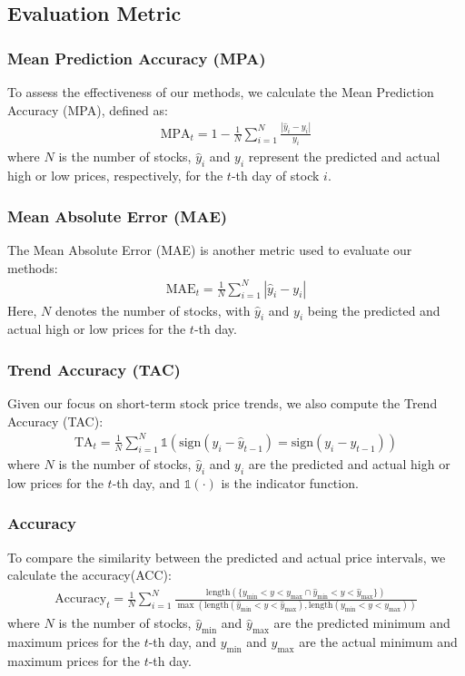 \subsection{Evaluation Metric}

\subsubsection{Mean Prediction Accuracy (MPA)}
To assess the effectiveness of our methods, we calculate the Mean Prediction Accuracy (MPA), defined as:
\begin{align}
    \label{eq:MPA}
    \text{MPA}_{t} = 1 - \frac{1}{N} \sum_{i=1}^{N} \frac{|\hat{y}_i - y_i|}{y_i}
\end{align}
where $ N $ is the number of stocks, $ \hat{y}_i $ and $ y_i $ represent the predicted and actual high or low prices, respectively, for the $ t $-th day of stock $ i $.

\subsubsection{Mean Absolute Error (MAE)}
The Mean Absolute Error (MAE) is another metric used to evaluate our methods:
\begin{align}
    \label{eq:MAE}
    \text{MAE}_{t} = \frac{1}{N} \sum_{i=1}^{N} |\hat{y}_i - y_i|
\end{align}
Here, $ N $ denotes the number of stocks, with $ \hat{y}_i $ and $ y_i $ being the predicted and actual high or low prices for the $ t $-th day.

\subsubsection{Trend Accuracy (TAC)}
Given our focus on short-term stock price trends, we also compute the Trend Accuracy (TAC):
\begin{align}
    \label{eq:TAC}
    \text{TA}_{t} = \frac{1}{N} \sum_{i=1}^{N} \mathbb{1}(\text{sign}(\hat{y}_i - \hat{y}_{t-1}) = \text{sign}(y_i - y_{t-1}))
\end{align}
where $ N $ is the number of stocks, $ \hat{y}_i $ and $ y_i $ are the predicted and actual high or low prices for the $ t $-th day, and $ \mathbb{1}(\cdot) $ is the indicator function.

\subsubsection{Accuracy}
To compare the similarity between the predicted and actual price intervals, we calculate the accuracy(ACC):
\begin{align}
    \label{eq:accuracy}
    \text{Accuracy}_{t} = \frac{1}{N} \sum_{i=1}^{N} \frac{\text{length}(\{ y_{\min}<y<y_{\max} \cap \hat{y}_{\min}<y<\hat{y}_{\max} \})}{\max(\text{length}(\hat{y}_{\min}<y<\hat{y}_{\max}), \text{length}(y_{\min}<y<y_{\max}))}
\end{align}
where $ N $ is the number of stocks, $ \hat{y}_{\min} $ and $ \hat{y}_{\max} $ are the predicted minimum and maximum prices for the $ t $-th day, and $ y_{\min} $ and $ y_{\max} $ are the actual minimum and maximum prices for the $ t $-th day.

